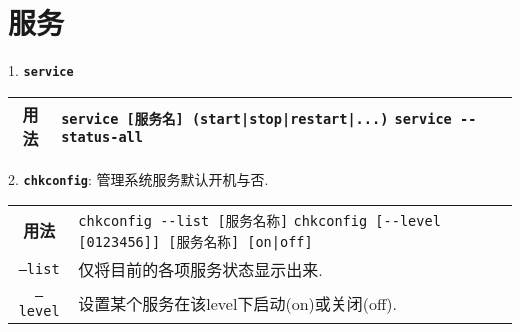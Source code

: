 \section{服务}
\par
1. \textbf{\texttt{service}} 
\begin{longtable}{c@{ : }p{}}\hline

    \textbf{用法} & \verb"service [服务名] (start|stop|restart|...)"\newline
    \verb"service --status-all"\\

    \hline
\end{longtable}

\par
2. \textbf{\texttt{chkconfig}}: 管理系统服务默认开机与否.
\begin{longtable}{c@{ : }p{}}\hline

    \textbf{用法} & \verb"chkconfig --list [服务名称]"\newline
                    \verb"chkconfig [--level [0123456]] [服务名称] [on|off]"\\
    
    \texttt{--list} & 仅将目前的各项服务状态显示出来.\\
    
    \texttt{--level} & 设置某个服务在该level下启动(on)或关闭(off).\\

    \hline
\end{longtable}